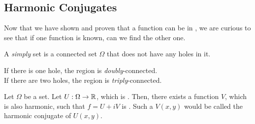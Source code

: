 \subsection{Harmonic Conjugates}\label{subsec:Harmonic_Conjugates}
Now that we have shown and proven that a function can be  in , we are curious to see that if one function is known, can we find the other one.

\begin{definition}[Simply]\label{def:Simply}
  A \emph{simply}  set is a connected set $\Omega$ that does not have any holes in it.

  \begin{remark}\label{rmk:Multiply_Connected}
    If there is one hole, the region is \emph{doubly}-connected. \\
    If there are two holes, the region is \emph{triply}-connected.
  \end{remark}
\end{definition}

\begin{theorem}\label{thm:Harmonic_Conjugate}
  Let $\Omega$ be a    set.
  Let $U: \Omega \to \operatorname{\mathbb{R}}$, which is .
  Then, there exists a function $V$, which is also harmonic, such that $f = U + iV$ is .
  Such a $V(x, y)$ would be called the harmonic conjugate of $U(x, y)$.
\end{theorem}

